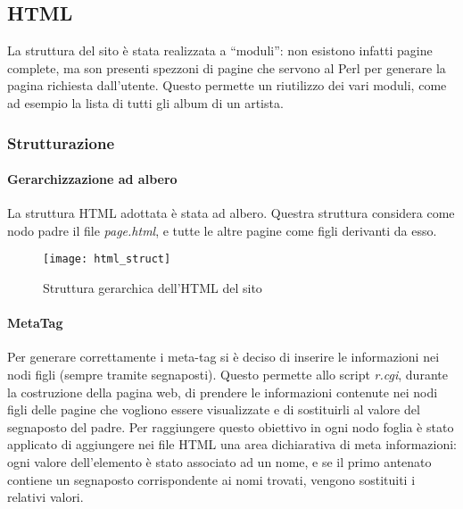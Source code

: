 \graphicspath{ {res/img/} }

\subsection{HTML}
La struttura del sito \`e stata realizzata a ``moduli'': non esistono infatti pagine complete, ma son presenti spezzoni di pagine che servono al Perl per generare la pagina richiesta dall'utente. Questo permette un riutilizzo dei vari moduli, come ad esempio la lista di tutti gli album di un artista.
\subsubsection{Strutturazione}

\paragraph*{Gerarchizzazione ad albero}La struttura HTML adottata \`e stata ad albero. Questra struttura considera come nodo padre il file \textit{page.html}, e tutte le altre pagine come figli derivanti da esso.


\begin{landscape}

  \thispagestyle{empty}

  \begin{figure}[H]
    \centering
    \texttt{[image: html\_struct]}
    \caption{Struttura gerarchica dell'HTML del sito}
  \end{figure}

\end{landscape}

\restoregeometry

\paragraph*{MetaTag}Per generare correttamente i meta-tag si \`e deciso di inserire le informazioni nei nodi figli (sempre tramite segnaposti). Questo permette allo script \textit{r.cgi}, durante la costruzione della pagina web, di prendere le informazioni contenute nei nodi figli delle pagine che vogliono essere visualizzate e di sostituirli al valore del segnaposto del padre. Per raggiungere questo obiettivo in ogni nodo foglia \`e stato applicato di aggiungere nei file HTML una area dichiarativa di meta informazioni: ogni valore dell'elemento \`e stato associato ad un nome, e se il primo antenato contiene un segnaposto corrispondente ai nomi trovati, vengono sostituiti i relativi valori.


